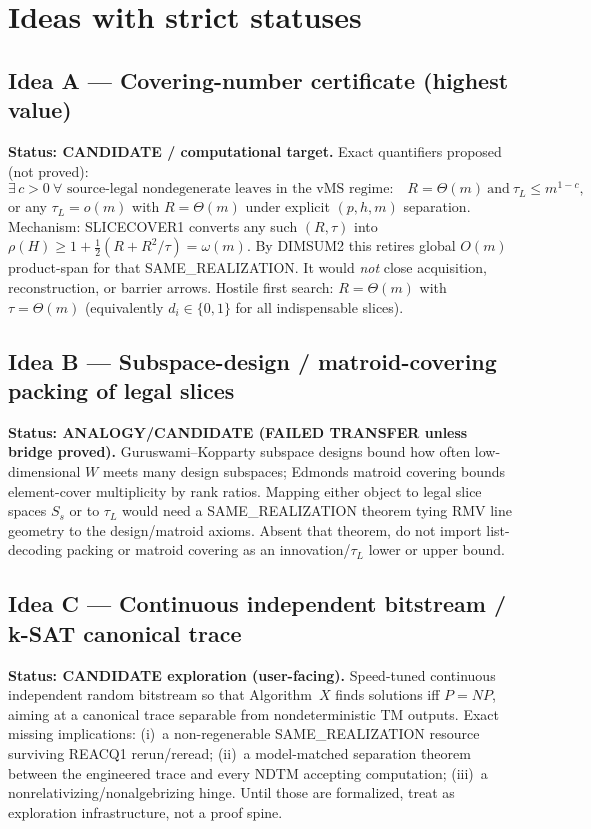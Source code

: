 \documentclass[11pt]{article}
\begin{document}
\section*{Ideas with strict statuses}
\subsection*{Idea A --- Covering-number certificate (highest value)}
\textbf{Status: CANDIDATE / computational target.}
Exact quantifiers proposed (not proved):
\[
\exists\,c>0\ \forall\text{ source-legal nondegenerate leaves in the vMS regime:}\quad
R=\Theta(m)\ \text{and}\ \tau_L\le m^{1-c},
\]
or any $\tau_L=o(m)$ with $R=\Theta(m)$ under explicit $(p,h,m)$ separation.
Mechanism: SLICECOVER1 converts any such $(R,\tau)$ into
$\rho(H)\ge 1+\tfrac12(R+R^2/\tau)=\omega(m)$. By DIMSUM2 this retires global $O(m)$
product-span for that SAME\_REALIZATION. It would \emph{not} close acquisition, reconstruction,
or barrier arrows. Hostile first search: $R=\Theta(m)$ with $\tau=\Theta(m)$ (equivalently
$d_i\in\{0,1\}$ for all indispensable slices).

\subsection*{Idea B --- Subspace-design / matroid-covering packing of legal slices}
\textbf{Status: ANALOGY/CANDIDATE (FAILED TRANSFER unless bridge proved).}
Guruswami--Kopparty subspace designs bound how often low-dimensional $W$ meets many design
subspaces; Edmonds matroid covering bounds element-cover multiplicity by rank ratios.
Mapping either object to legal slice spaces $S_s$ or to $\tau_L$ would need a SAME\_REALIZATION
theorem tying RMV line geometry to the design/matroid axioms. Absent that theorem, do not import
list-decoding packing or matroid covering as an innovation/$\tau_L$ lower or upper bound.

\subsection*{Idea C --- Continuous independent bitstream / k-SAT canonical trace}
\textbf{Status: CANDIDATE exploration (user-facing).}
Speed-tuned continuous independent random bitstream so that Algorithm~$X$ finds solutions iff
$P=NP$, aiming at a canonical trace separable from nondeterministic TM outputs.
Exact missing implications: (i)~a non-regenerable SAME\_REALIZATION resource surviving REACQ1
rerun/reread; (ii)~a model-matched separation theorem between the engineered trace and every
NDTM accepting computation; (iii)~a nonrelativizing/nonalgebrizing hinge. Until those are
formalized, treat as exploration infrastructure, not a proof spine.
\end{document}

